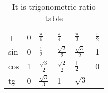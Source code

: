 \begin{table}[h]
\centering
\begin{tabular}{llllll}
+ & 0 & $\frac{\pi}{6}$ & $\frac{\pi}{4}$ & $\frac{\pi}{3}$ & $\frac{\pi}{2}$\\
sin & 0 & $\frac{1}{2}$ & $\frac{\sqrt{2}}{2}$ & $\frac{\sqrt{3}}{2}$ & 1\\
cos & 1 & $\frac{\sqrt{3}}{2}$ & $\frac{\sqrt{2}}{2}$ & $\frac{1}{2}$ & 0 \\
tg & 0 & $\frac{\sqrt{3}}{3}$ & 1 & $\sqrt{3}$ & -
\end{tabular}
\caption{It is trigonometric ratio table}
\label{tab:trigonometric}
\end{table}
